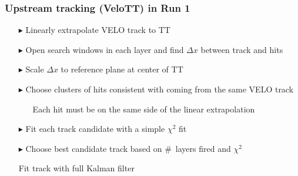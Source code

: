 \documentclass[aspectratio=1610]{beamer}
\begin{document}
\begin{frame}\frametitle{Upstream tracking (VeloTT) in Run 1}
  \begin{itemize}
  \item[$\blacktriangleright$] Linearly extrapolate VELO track to TT
  \item[$\blacktriangleright$] Open search windows in each layer and find $\Delta x$ between track and hits
  \item[$\blacktriangleright$] Scale $\Delta x$ to reference plane at center of TT
  \item[$\blacktriangleright$] Choose clusters of hits consistent with coming from the same VELO track
  \begin{itemize}
    \item[\ding{80}] Each hit must be on the same side of the linear extrapolation
  \end{itemize}
  \item[$\blacktriangleright$] Fit each track candidate with a simple $\chi^{2}$ fit
  \item[$\blacktriangleright$] Choose best candidate track based on \mbox{\# layers} fired and $\chi^{2}$
  \item[\ding{80}] Fit track with full Kalman filter
  \end{itemize}
  
\end{frame}
\end{document}
